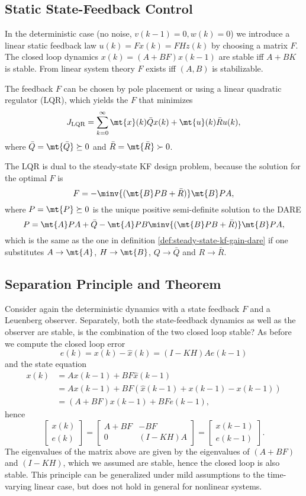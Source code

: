 \documentclass[]{hsrzf}
\theoremstyle{plain}
\theoremstyle{definition}
\theoremstyle{remark}
\begin{document}
\subsection{Static State-Feedback Control}

In the deterministic case (no noise, $v(k-1) = 0, w(k) = 0$) we introduce a
linear static feedback law $u(k) = Fx(k) = FHz(k)$ by choosing a matrix $F$.
The closed loop dynamics $x(k) = (A + BF) x(k-1)$ are stable iff $A + BK$ is
stable. From linear system theory $F$ exists iff $(A,B)$ is stabilizable.

The feedback $F$ can be chosen by pole placement or using a linear quadratic
regulator (LQR), which yields the $F$ that minimizes
\[
  J_\text{LQR} = \sum_{k=0}^\infty \mt{x}(k) \bar{Q} x(k)
    + \mt{u}(k) \bar{R} u(k),
\]
where $\bar{Q} = \mt{\bar{Q}} \succeq 0$ and $\bar{R} = \mt{\bar{R}} \succ 0$.

The LQR is dual to the steady-state KF design problem, because the solution
for the optimal $F$ is
\[
  F = -\minv{(\mt{B} P B + \bar{R})} \mt{B} PA,
\]
where $P = \mt{P} \succeq 0$ is the unique positive semi-definite solution to
the DARE
\[
  P = \mt{A} P A + \bar{Q}
    - \mt{A} P B \minv{(\mt{B} P B + \bar{R})} \mt{B} P A,
\]
which is the same as the one in definition
\ref{def:steady-state-kf-gain-dare} if one substitutes $A \to \mt{A}$, $H \to
\mt{B}$, $Q \to \bar{Q}$ and $R \to \bar{R}$.

\subsection{Separation Principle and Theorem}

Consider again the deterministic dynamics with a state feedback $F$ and a
Leuenberg observer. Separately, both the state-feedback dynamics as well as
the observer are stable, is the combination of the two closed loop stable?
As before we compute the closed loop error
\[
  e(k) = x(k) - \hat{x}(k) = (I - KH) A e(k-1)
\]
and the state equation
\begin{align*}
  x(k) &= Ax(k-1) + BF\hat{x}(k-1) \\
    &= Ax(k-1) + BF(\hat{x}(k-1) + x(k-1) - x(k-1)) \\
    &= (A + BF) x(k-1) + BF e(k-1),
\end{align*}
hence
\[
  \begin{bmatrix} x(k) \\ e(k) \end{bmatrix} =
    \begin{bmatrix}
      A + BF & -BF \\
      0 & (I - KH)A
    \end{bmatrix}
    = \begin{bmatrix} x(k-1) \\ e(k-1) \end{bmatrix}.
\]
The eigenvalues of the matrix above are given by the eigenvalues of $(A + BF)$
and $(I - KH)$, which we assumed are stable, hence the closed loop is also
stable. This principle can be generalized under mild assumptions to the
time-varying linear case, but does not hold in general for nonlinear systems.
\end{document}
